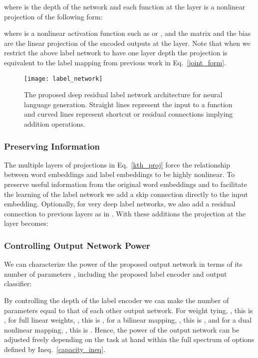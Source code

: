 \documentclass{article}
\begin{document}
\noindent where  is the depth of the network and 
each function  at the  layer is a nonlinear projection of the following form: 

where  is a nonlinear activation function such as  or , and the matrix  and the bias  are the linear projection of the encoded outputs at the  layer. Note that when we restrict the above label network to have  one layer depth the projection is equivalent to the label mapping from previous work in Eq.~\ref{joint_form}.


\begin{figure*}
 	\centering
 	\hspace{5mm}\texttt{[image: label\_network]}
 	\vspace{-2mm}
 	\caption{The proposed deep residual label network architecture for neural language generation. Straight lines represent the input to a function and curved lines represent shortcut or residual connections implying addition operations.}
 	\label{schema-mini}
\end{figure*}

\subsubsection{Preserving Information}
The multiple layers of projections in Eq.~\ref{kth_proj} force the relationship between word embeddings  and label embeddings  to be highly nonlinear. To preserve useful information from the original word embeddings and to facilitate the learning of the label network we add a skip connection directly to the input embedding. Optionally, for very deep label networks, we also add a residual connection to previous layers as in \citep{resnet15}. With these additions the projection at the  layer becomes:

 


\subsubsection{Controlling Output Network Power}
We can characterize the power of the proposed output network in terms of its number of parameters ,  including the proposed label encoder and output classifier:

By controlling the depth of the label encoder we can make the number of parameters equal to that of each other output network.  For weight tying, , this is , for full linear weights, , this is , for a bilinear mapping, , this is , and for a dual nonlinear mapping, , this is .  Hence, the power of the output network can be adjusted freely depending on the task at hand within the full spectrum of options defined by Ineq.~\ref{capacity_ineq}. 
\end{document}
